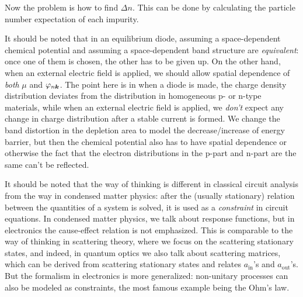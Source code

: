 \documentclass[hyperref, a4paper]{article}
\begin{document}
Now the problem is how to find $\Delta n$.
This can be done by calculating the particle number expectation of each impurity.

It should be noted that in an equilibrium diode, 
assuming a space-dependent chemical potential 
and assuming a space-dependent band structure 
are \emph{equivalent}:
once one of them is chosen,
the other has to be given up.
On the other hand, 
when an external electric field is applied,
we should allow spatial dependence of \emph{both} $\mu$ and $\varphi_{n \vb*{k}}$.
The point here is in when a diode is made,
the charge density distribution deviates from 
the distribution in homogeneous p- or n-type materials,
while when an external electric field is applied,
we \emph{don't} expect any change in charge distribution after a stable current is formed.
We change the band distortion in the depletion area 
to model the decrease/increase of energy barrier,
but then the chemical potential also has to have spatial dependence
or otherwise the fact that 
the electron distributions in the p-part and n-part are the same can't be reflected.

It should be noted that the way of thinking is different in classical circuit analysis
from the way in condensed matter physics:
after the (usually stationary) relation between the quantities of a system is solved,
it is used as a \emph{constraint} 
in circuit equations.
In condensed matter physics, we talk about response functions,
but in electronics the cause-effect relation is not emphasized.
This is comparable to the way of thinking in scattering theory,
where we focus on the scattering stationary states,
and indeed, in quantum optics we also talk about scattering matrices,
which can be derived from scattering stationary states 
and relates $a_{\text{in}}$'s and $a_{\text{out}}$'s.
But the formalism in electronics is more generalized:
non-unitary processes can also be modeled as constraints,
the most famous example being the Ohm's law.
\end{document}
